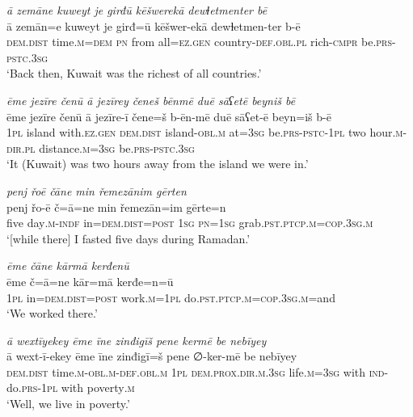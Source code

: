 \ea \label{ŽM.43}
\textit{ā zemāne kuweyt je girđū kēšwerekā dewɫetmenter bē} \\ 
\gll ā zemān=e kuweyt je girđ=ū kēšwer-ekā dewɫetmen-ter b-ē \\ 
 \textsc{dem.dist} time\textsc{.m}\textsc{=dem} \textsc{pn} from all\textsc{=ez.gen} country\textsc{-def}\textsc{.obl}\textsc{.pl} rich\textsc{-cmpr} be\textsc{.prs}\textsc{-pstc}\textsc{.3sg} \\ 
\glt `Back then, Kuwait was the richest of all countries.'
\z 
 
\ea \label{ŽM.45}
\textit{ēme jezīre čenū ā jezīrey čeneš bēnmē duē sāʕetē beyniš bē} \\ 
\gll ēme jezīre čenū ā jezīre-ī čene=š b-ēn-mē duē sāʕet-ē beyn=iš b-ē \\ 
 \textsc{1pl} island with\textsc{\textsc{.ez}.gen} \textsc{dem.dist} island\textsc{-obl}\textsc{.m} at\textsc{=3sg} be\textsc{.prs}\textsc{-pstc}\textsc{-\textsc{1pl}} two hour\textsc{.m}\textsc{-dir}\textsc{.pl} distance\textsc{.m}\textsc{=3sg} be\textsc{.prs}\textsc{-pstc}\textsc{.3sg} \\ 
\glt `It (Kuwait) was two hours away from the island we were in.'
\z 
 
\ea \label{ŽM.47}
\textit{penj řoē čāne min řemezānim gērten} \\ 
\gll penj řo-ē č=ā=ne min řemezān=im gērte=n \\ 
 five day\textsc{.m}\textsc{-indf} in=\textsc{dem.dist}\textsc{=\textsc{post}} \textsc{1sg} \textsc{pn}\textsc{=\textsc{1sg}} grab\textsc{.pst}\textsc{.ptcp}\textsc{.m}\textsc{=cop}\textsc{.3sg}\textsc{.m} \\ 
\glt `[while there] I fasted five days during Ramadan.'
\z 
 
\ea \label{ŽM.50}
\textit{ēme čāne kārmā kerđenū} \\ 
\gll ēme č=ā=ne kār=mā kerđe=n=ū \\ 
 \textsc{1pl} in=\textsc{dem.dist}\textsc{=\textsc{post}} work\textsc{.m}\textsc{=\textsc{1pl}} do\textsc{.pst}\textsc{.ptcp}\textsc{.m}\textsc{=cop}\textsc{.3sg}\textsc{.m}=and \\ 
\glt `We worked there.'
\z 
 
\ea \label{ŽM.57}
\textit{ā wextīyekey ēme īne zinđigīš pene kermē be nebīyey} \\ 
\gll ā wext-ī-ekey ēme īne zinđigī=š pene ∅-ker-mē be nebīyey \\ 
 \textsc{dem.dist} time\textsc{.m}\textsc{-obl}\textsc{.m}\textsc{-def}\textsc{.obl}\textsc{.m} \textsc{1pl} \textsc{dem.prox}\textsc{.dir}\textsc{.m}\textsc{.3sg} life\textsc{.m}\textsc{=3sg} with \textsc{ind-}do\textsc{.prs}\textsc{-\textsc{1pl}} with poverty\textsc{.m} \\ 
\glt `Well, we live in poverty.'
\z 
 
